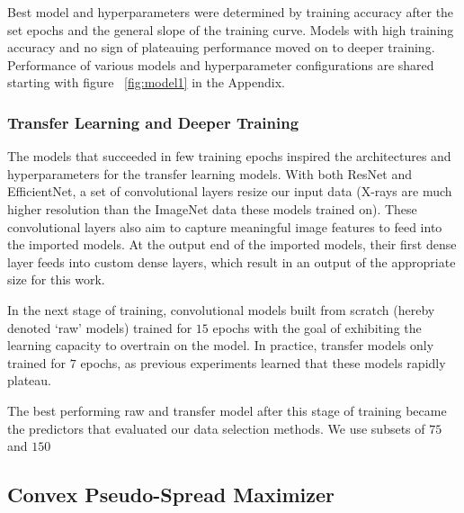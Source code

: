 \documentclass[10pt,twocolumn,letterpaper]{article}
\begin{document}
Best model and hyperparameters were determined by training accuracy after the set epochs and the general slope of the training curve. Models with high training accuracy and no sign of plateauing performance moved on to deeper training. Performance of various models and hyperparameter configurations are shared starting with figure ~\ref{fig:model1} in the Appendix.




\subsubsection{Transfer Learning and Deeper Training}

The models that succeeded in few training epochs inspired the architectures and hyperparameters for the transfer learning models. With both ResNet and EfficientNet, a set of convolutional layers resize our input data (X-rays are much higher resolution than the ImageNet data these models trained on). These convolutional layers also aim to capture meaningful image features to feed into the imported models. At the output end of the imported models, their first dense layer feeds into custom dense layers, which result in an output of the appropriate size for this work.

In the next stage of training, convolutional models built from scratch (hereby denoted `raw' models) trained for $15$ epochs with the goal of exhibiting the learning capacity to overtrain on the model. In practice, transfer models only trained for $7$ epochs, as previous experiments learned that these models rapidly plateau.

The best performing raw and transfer model after this stage of training became the predictors that evaluated our data selection methods. We use subsets of $75$ and $150$


\subsection{Convex Pseudo-Spread Maximizer}
\end{document}
